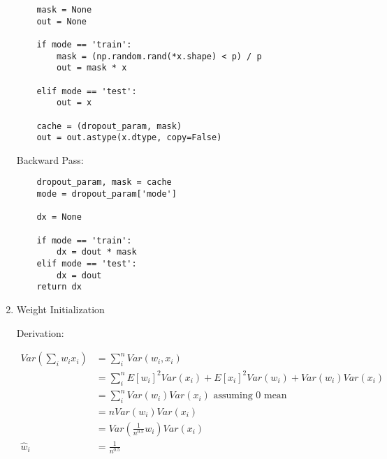 \documentclass[12pt,letter]{article}
\begin{document}
\begin{enumerate}
\begin{verbatim}
    mask = None
    out = None
    
    if mode == 'train':
        mask = (np.random.rand(*x.shape) < p) / p
        out = mask * x

    elif mode == 'test':
        out = x

    cache = (dropout_param, mask)
    out = out.astype(x.dtype, copy=False)
\end{verbatim}

  Backward Pass:

\begin{verbatim}
    dropout_param, mask = cache
    mode = dropout_param['mode']

    dx = None

    if mode == 'train':
        dx = dout * mask
    elif mode == 'test':
        dx = dout
    return dx
\end{verbatim}

  \pagebreak
  
\item Weight Initialization

  Derivation:

  \begin{align*}
    Var(\sum_i w_i x_i) &= \sum_i^n Var(w_i, x_i)\\
                        &= \sum_i^n E[w_i]^2 Var(x_i) + E[x_i]^2 Var(w_i) + Var(w_i) Var(x_i)\\
                        &= \sum_i^n Var(w_i) Var(x_i) \text{ assuming 0 mean}\\
                        &= n Var(w_i) Var(x_i)\\
                        &= Var(\frac{1}{n^{0.5}} w_i) Var(x_i)\\
    \hat{w}_i &= \frac{1}{n^{0.5}}
  \end{align*}
  
\end{enumerate}
\end{document}
